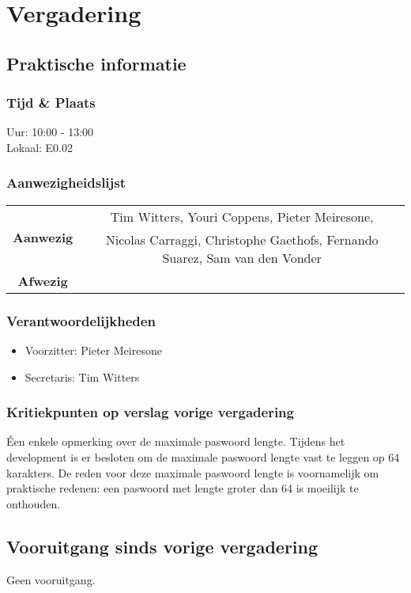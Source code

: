 \section{Vergadering \MeetingDate}
\subsection{Praktische informatie}
\subsubsection{Tijd \& Plaats}
Uur: 10:00 - 13:00
\\
Lokaal: E0.02

\subsubsection{Aanwezigheidslijst}
\begin{table}[htbp]
	\centering
	\begin{tabular}{c|c}
		\multirow{2}{*}{\textbf{Aanwezig}} & Tim Witters, Youri Coppens, Pieter Meiresone, \\
		& Nicolas Carraggi,  Christophe Gaethofs, Fernando Suarez, Sam van den Vonder \\
		\hline
		\textbf{Afwezig} & \\
	\end{tabular}
\end{table}


\subsubsection{Verantwoordelijkheden}
\begin{itemize}
	\item Voorzitter: Pieter Meiresone
	\item Secretaris: Tim Witters
\end{itemize}


\subsubsection{Kritiekpunten op verslag vorige vergadering}
Éen enkele opmerking over de maximale paswoord lengte. Tijdens het development is er besloten om de maximale paswoord lengte vast te leggen op 64 karakters. De reden voor deze maximale paswoord lengte is voornamelijk om praktische redenen: een paswoord met lengte groter dan 64 is moeilijk te onthouden.

\subsection{Vooruitgang sinds vorige vergadering} \label{sec:Vooruitgang}
Geen vooruitgang.

